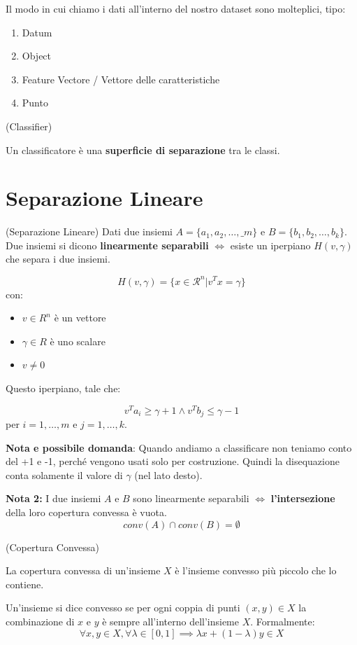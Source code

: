 Il modo in cui chiamo i dati all'interno del nostro dataset sono molteplici,
tipo:
\begin{enumerate}
    \item Datum
    \item Object
    \item Feature Vectore / Vettore delle caratteristiche
    \item Punto
\end{enumerate}

\begin{definition}
    (Classifier)

    Un classificatore è una \textbf{superficie di separazione} tra le classi.
\end{definition}
\newpage
\section{Separazione Lineare}
\begin{definition}
    (Separazione Lineare)
    Dati due insiemi $A = \{a_1, a_2, \dots, \_m\}$ e $B = \{b_1, b_2, \dots, b_k\}$. Due insiemi si dicono \textbf{linearmente separabili} $\iff$ esiste un iperpiano $H(v,\gamma)$ che separa i due insiemi.

    $$
        H(v,\gamma) = \{x \in \mathcal{R}^n | v^T x = \gamma\}
    $$
    con:
    \begin{itemize}
        \item $v \in R^n$ è un vettore
        \item $\gamma \in R$ è uno scalare
        \item $v \neq 0$
    \end{itemize}

    Questo iperpiano, tale che:

    $$
        v^T a_i \geq \gamma + 1 \land v^T b_j \leq \gamma - 1
    $$
    per $i = 1, \dots, m$ e $j = 1, \dots, k$.
\end{definition}

\textbf{Nota e possibile domanda}: Quando andiamo a classificare non teniamo conto del +1 e -1, perché vengono usati solo per costruzione.
Quindi la disequazione conta solamente il valore di $\gamma$ (nel lato desto).

\textbf{Nota 2:} I due insiemi $A$ e $B$ sono linearmente separabili $\iff$ \textbf{l'intersezione} della loro copertura convessa è vuota.
$$
    conv(A) \cap conv(B) = \emptyset
$$

\begin{definition}
    (Copertura Convessa)

    La copertura convessa di un'insieme $X$ è l'insieme convesso più piccolo che lo
    contiene.

    Un'insieme si dice convesso se per ogni coppia di punti $(x,y) \in X$ la
    combinazione di $x$ e $y$ è sempre all'interno dell'insieme $X$. Formalmente:
    $$ \forall x,y \in X, \forall \lambda \in [0,1] \implies \lambda x + (1 -
        \lambda) y \in X $$
\end{definition}

